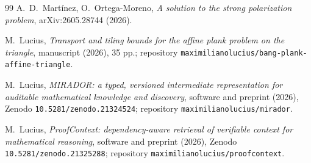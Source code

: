 \documentclass[11pt]{amsart}
\theoremstyle{definition}
\theoremstyle{remark}
\begin{document}
\begin{thebibliography}{99}
 A.~D.~Mart\'inez, O.~Ortega-Moreno, \emph{A solution to the
strong polarization problem}, arXiv:2605.28744 (2026).

 M.~Lucius, \emph{Transport and tiling bounds for the affine
plank problem on the triangle}, manuscript (2026), 35 pp.; repository
\texttt{maximilianolucius/bang-plank-affine-triangle}.

 M.~Lucius, \emph{MIRADOR: a typed, versioned
intermediate representation for auditable mathematical knowledge and discovery},
software and preprint (2026), Zenodo \texttt{10.5281/zenodo.21324524};
repository \texttt{maximilianolucius/mirador}.

 M.~Lucius, \emph{ProofContext: dependency-aware
retrieval of verifiable context for mathematical reasoning}, software and
preprint (2026), Zenodo \texttt{10.5281/zenodo.21325288}; repository
\texttt{maximilianolucius/proofcontext}.

\end{thebibliography}
\end{document}

